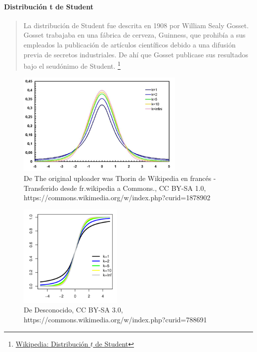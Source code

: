 \paragraph{Distribución t de Student}
\begin{quote}
 La distribución de Student fue descrita en 1908 por William Sealy Gosset. Gosset trabajaba en una fábrica de cerveza, Guinness, que prohibía a sus empleados la publicación de artículos científicos debido a una difusión previa de secretos industriales. De ahí que Gosset publicase sus resultados bajo el seudónimo de Student. \footnote{
\href{https://es.wikipedia.org/wiki/Distribuci\%C3\%B3n\_t\_de\_Student\#Historia}{Wikipedia: Distribución $t$ de Student}
}
\end{quote}


\begin{figure}
 \centering
 \includegraphics[height=5cm,keepaspectratio=true]{./images/Student_densite_best.jpg}
 \caption{De The original uploader was Thorin de Wikipedia en francés - Transferido desde fr.wikipedia a Commons., CC BY-SA 1.0, https://commons.wikimedia.org/w/index.php?curid=1878902}
 \label{fig:tPDF}
\end{figure}




 \begin{figure}
 \centering
 \includegraphics[height=5cm,keepaspectratio=true]{./images/T_distributionCDF.png}
 \caption{De Desconocido, CC BY-SA 3.0, https://commons.wikimedia.org/w/index.php?curid=788691}
 \label{fig:tCDF}
\end{figure}

